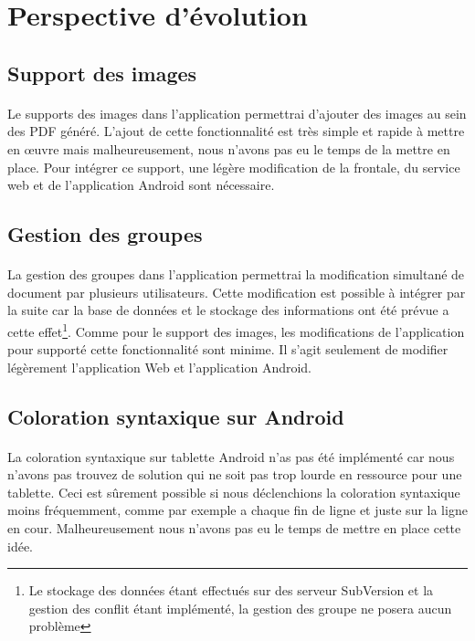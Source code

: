 \documentclass[a4paper,12pt]{article}
\begin{document}
\newpage
\section{Perspective d'évolution}
\subsection{Support des images}
\paragraph*{}
Le supports des images dans l'application permettrai d'ajouter des images au sein des PDF généré. L'ajout de cette fonctionnalité est très simple et rapide à mettre en \oe uvre mais malheureusement, nous n'avons pas eu le temps de la mettre en place. Pour intégrer ce support, une légère modification de la frontale, du service web et de l'application Android sont nécessaire.

\subsection{Gestion des groupes}
\paragraph*{}
La gestion des groupes dans l'application permettrai la modification simultané de document par plusieurs utilisateurs. Cette modification est possible à intégrer par la suite car la base de données et le stockage des informations ont été prévue a cette effet\footnote{Le stockage des données étant effectués sur des serveur SubVersion et la gestion des conflit étant implémenté, la gestion des groupe ne posera aucun problème}. Comme pour le support des images, les modifications de l'application pour supporté cette fonctionnalité sont minime. Il s'agit seulement de modifier légèrement l'application Web et l'application Android.

\subsection{Coloration syntaxique sur Android}
\paragraph*{}
La coloration syntaxique sur tablette Android n'as pas été implémenté car nous n'avons pas trouvez de solution qui ne soit pas trop lourde en ressource pour une tablette. Ceci est sûrement possible si nous déclenchions la coloration syntaxique moins fréquemment, comme par exemple a chaque fin de ligne et juste sur la ligne en cour. Malheureusement nous n'avons pas eu le temps de mettre en place cette idée.
\end{document}
